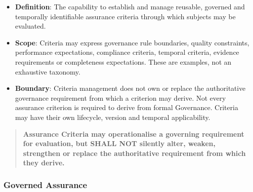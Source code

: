 \begin{itemize}

\item 
\textbf{Definition}: The capability to establish and manage reusable, governed and temporally identifiable assurance criteria through which subjects may be evaluated.



\item 
\textbf{Scope}: Criteria may express governance rule boundaries, quality constraints, performance expectations, compliance criteria, temporal criteria, evidence requirements or completeness expectations. These are examples, not an exhaustive taxonomy.



\item 
\textbf{Boundary}: Criteria management does not own or replace the authoritative governance requirement from which a criterion may derive. Not every assurance criterion is required to derive from formal Governance. Criteria may have their own lifecycle, version and temporal applicability.



\end{itemize}
\label{rad:enabling:692}

\begin{quote}

\textbf{Assurance Criteria may operationalise a governing requirement for evaluation, but SHALL NOT silently alter, weaken, strengthen or replace the authoritative requirement from which they derive.}


\end{quote}
\label{rad:enabling:694}
\subsubsection*{Governed Assurance}
\label{rad:enabling:696}

